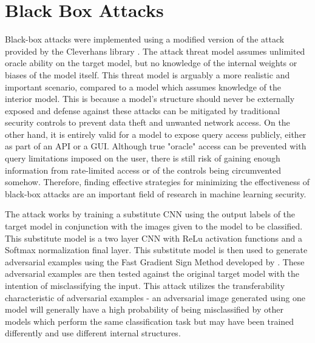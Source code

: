 \section{Black Box Attacks} \label{s:blackboxattacks}
Black-box attacks were implemented using a modified version of the attack provided by the Cleverhans library \cite{papernot2018cleverhans}.
The attack threat model assumes unlimited oracle ability on the target model, but no knowledge of the internal weights or biases of the model itself.
This threat model is arguably a more realistic and important scenario, compared to a model which assumes knowledge of the interior model.
This is because a model's structure should never be externally exposed and defense against these attacks can be mitigated by traditional security controls to prevent data theft and unwanted network access.
On the other hand, it is entirely valid for a model to expose query access publicly, either as part of an API or a GUI. Although true "oracle" access can be prevented with query limitations imposed on the user, there is still risk of gaining enough information from rate-limited access or of the controls being circumvented somehow.
Therefore, finding effective strategies for minimizing the effectiveness of black-box attacks are an important field of research in machine learning security.

The attack works by training a substitute CNN using the output labels of the target model in conjunction with the images given to the model to be classified.
This substitute model is a two layer CNN with ReLu activation functions and a Softmax normalization final layer.
This substitute model is then used to generate adversarial examples using the Fast Gradient Sign Method developed by \citeauthor{goodfellow2015} \cite{goodfellow2015}.
These adversarial examples are then tested against the original target model with the intention of misclassifying the input.
This attack utilizes the transferability characteristic of adversarial examples - an adversarial image generated using one model will generally have a high probability of being misclassified by other models which perform the same classification task but may have been trained differently and use different internal structures.

